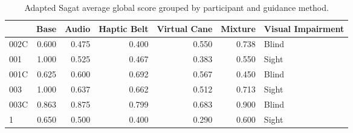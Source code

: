 
\begin{table}[!htb]
\centering
\caption{Adapted Sagat average global score grouped by participant and guidance method.}
\label{tab:sagat_average}
\begin{tabular}{lrrrrrl}
\toprule
{} &  Base &  Audio &  Haptic Belt &  Virtual Cane &  Mixture & Visual Impairment \\
\midrule
002C & 0.600 &  0.475 &        0.400 &         0.550 &    0.738 &             Blind \\
001  & 1.000 &  0.525 &        0.467 &         0.383 &    0.550 &             Sight \\
001C & 0.625 &  0.600 &        0.692 &         0.567 &    0.450 &             Blind \\
003  & 1.000 &  0.637 &        0.662 &         0.512 &    0.713 &             Sight \\
003C & 0.863 &  0.875 &        0.799 &         0.683 &    0.900 &             Blind \\
1    & 0.650 &  0.500 &        0.400 &         0.290 &    0.600 &             Sight \\
\bottomrule
\end{tabular}
\end{table}

